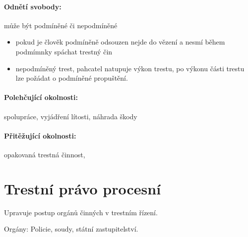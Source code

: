 \documentclass[10pt,a4paper,
twoside,%
]{report}
\begin{document}
\paragraph{Odnětí svobody:} může být podmíněné či nepodmíněné
\begin{itemize}
\item pokud je člověk podmíněně odsouzen nejde do vězení a nesmí během podmímnky spáchat trestný čin

\item nepodmíněný trest, pahcatel natupuje výkon trestu, po výkonu části trestu lze požádat o podmíněné propuštění.
\end{itemize}
\paragraph{Polehčující okolnosti:} spolupráce, vyjádření lítosti, náhrada škody

\paragraph{Přitěžující okolnosti:}opakovaná trestná činnost, 


\section{Trestní právo procesní}
Upravuje postup orgánů činných v trestním řízení.

Orgány: Policie, soudy, státní zastupitelství.

\dotfill{} \vspace{0.6cm}

\dotfill{} \vspace{0.6cm}

\dotfill{} \vspace{0.6cm}

\dotfill{} \vspace{0.6cm}

\dotfill{} \vspace{0.6cm}

\dotfill{} \vspace{0.6cm}

\dotfill{} \vspace{0.6cm}

\dotfill{} \vspace{0.6cm}

\dotfill{} \vspace{0.6cm}


\dotfill{} \vspace{0.6cm}
\end{document}
